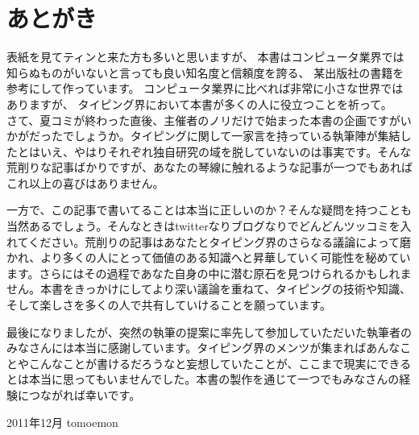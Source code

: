 \onecolumn

\part*{あとがき}

表紙を見てティンと来た方も多いと思いますが、
本書はコンピュータ業界では知らぬものがいないと言っても良い知名度と信頼度を誇る、
某出版社の書籍を参考にして作っています。
コンピュータ業界に比べれば非常に小さな世界ではありますが、
タイピング界において本書が多くの人に役立つことを祈って。\\

さて、夏コミが終わった直後、主催者のノリだけで始まった本書の企画ですがいかがだったでしょうか。タイピングに関して一家言を持っている執筆陣が集結したとはいえ、やはりそれぞれ独自研究の域を脱していないのは事実です。そんな荒削りな記事ばかりですが、あなたの琴線に触れるような記事が一つでもあればこれ以上の喜びはありません。

一方で、この記事で書いてることは本当に正しいのか？そんな疑問を持つことも当然あるでしょう。そんなときはtwitterなりブログなりでどんどんツッコミを入れてください。荒削りの記事はあなたとタイピング界のさらなる議論によって磨かれ、より多くの人にとって価値のある知識へと昇華していく可能性を秘めています。さらにはその過程であなた自身の中に潜む原石を見つけられるかもしれません。本書をきっかけにしてより深い議論を重ねて、タイピングの技術や知識、そして楽しさを多くの人で共有していけることを願っています。

最後になりましたが、突然の執筆の提案に率先して参加していただいた執筆者のみなさんには本当に感謝しています。タイピング界のメンツが集まればあんなことやこんなことが書けるだろうなと妄想していたことが、ここまで現実にできるとは本当に思ってもいませんでした。本書の製作を通じて一つでもみなさんの経験につながれば幸いです。

\begin{flushright}
2011年12月 tomoemon
\end{flushright}

